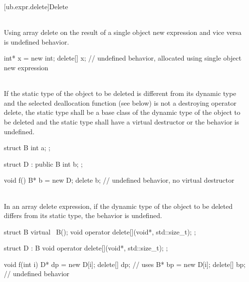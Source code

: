 [ub.expr.delete]{Delete}

\pnum
{} \\
Using array delete on the result of a single object new expression and vice versa is undefined behavior.

\pnum
\begin{example}
\begin{codeblock}
int* x = new int;
delete[] x;             // undefined behavior, allocated using single object new expression
\end{codeblock}
\end{example}


\pnum
{} \\
If the static type of the object to be deleted is different from its dynamic
type and the selected deallocation function (see below) is not a destroying operator delete, the static type
shall be a base class of the dynamic type of the object to be deleted and the static type shall have a virtual
destructor or the behavior is undefined.

\pnum
\begin{example}
\begin{codeblock}
struct B {
  int a;
};

struct D : public B {
  int b;
};

void f() {
  B* b = new D;
  delete b;             // undefined behavior, no virtual destructor
}
\end{codeblock}
\end{example}


\pnum
{} \\
In an array delete expression, if the dynamic type of the object to be deleted differs from its static type, the behavior is undefined.

\pnum
\begin{example}
\begin{codeblock}
struct B {
  virtual ~B();
  void operator delete[](void*, std::size_t);
};

struct D : B {
  void operator delete[](void*, std::size_t);
};

void f(int i) {
  D* dp = new D[i];
  delete[] dp;          // uses 
  B* bp = new D[i];
  delete[] bp;          // undefined behavior
}
\end{codeblock}
\end{example}


